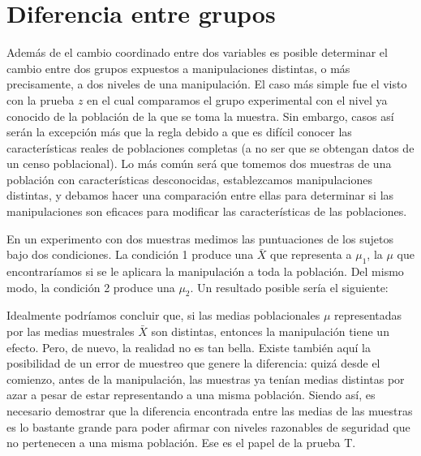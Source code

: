\documentclass[a4paper,12pt]{article}
\begin{document}
\section{Diferencia entre grupos}\label{diferenciaentregrupos}

Además de el cambio coordinado entre dos variables es posible determinar el cambio entre dos grupos expuestos a manipulaciones distintas, o más precisamente, a dos niveles de una manipulación. El caso más simple fue el visto con la prueba $z$ en el cual comparamos el grupo experimental con el nivel ya conocido de la población de la que se toma la muestra. Sin embargo, casos así serán la excepción más que la regla debido a que es difícil conocer las características reales de poblaciones completas (a no ser que se obtengan datos de un censo poblacional). Lo más común será que tomemos dos muestras de una población con características desconocidas, establezcamos manipulaciones distintas, y debamos hacer una comparación entre ellas para determinar si las manipulaciones son eficaces para modificar las características de las poblaciones.

En un experimento con dos muestras medimos las puntuaciones de los sujetos bajo dos condiciones. La condición 1 produce una ${\bar{X}}$ que representa a $\mu_{1}$, la $\mu$ que encontraríamos si se le aplicara la manipulación a toda la población. Del mismo modo, la condición 2 produce una $\mu_{2}$. Un resultado posible sería el siguiente:


Idealmente podríamos concluir que, si las medias poblacionales $\mu$ representadas por las medias muestrales $\bar{X}$ son distintas, entonces la manipulación tiene un efecto. Pero, de nuevo, la realidad no es tan bella. Existe también aquí la posibilidad de un error de muestreo que genere la diferencia: quizá desde el comienzo, antes de la manipulación, las muestras ya tenían medias distintas por azar a pesar de estar representando a una misma población. Siendo así, es necesario demostrar que la diferencia encontrada entre las medias de las muestras es lo bastante grande para poder afirmar con niveles razonables de seguridad que no pertenecen a una misma población. Ese es el papel de la prueba T.
\end{document}
